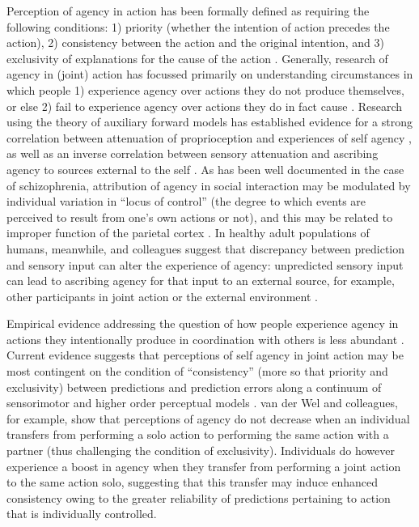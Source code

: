 \begin{CJK}{UTF8}{gbsn}
Perception of agency in action has been formally defined as requiring the following conditions: 1) priority (whether the intention of action precedes the action), 2) consistency between the action and the original intention, and 3) exclusivity of explanations for the cause of the action \citep{Wegner1999}.  Generally, research of agency in (joint) action has focussed primarily on understanding circumstances in which people 1) experience agency over actions they do not produce themselves, or else 2) fail to experience agency over actions they do in fact cause \citep[see][]{VanderWel2012}.  Research using the theory of auxiliary forward models has established evidence for a strong correlation between attenuation of proprioception and experiences of self agency \citep{Wolpert2003,Sato2008}, as well as an inverse correlation between sensory attenuation and ascribing agency to sources external to the self \citep{Brown2013}.  As has been well documented in the case of schizophrenia, attribution of agency in social interaction may be modulated by individual variation in ``locus of control'' (the degree to which events are perceived to result from one’s own actions or not), and this may be related to improper function of the parietal cortex \citep{Frith2000}. In healthy adult populations of humans, meanwhile, \textcite{Sato2008} and colleagues suggest that discrepancy between prediction and sensory input can alter the experience of agency:  unpredicted sensory input can lead to ascribing agency for that input to an external source, for example, other participants in joint action or the external environment \citep{Sato2005,Frith2007}.

Empirical evidence addressing the question of how people experience agency in actions they intentionally produce in coordination with others is less abundant \citep[but hsee][]{VanderWel2012,VanderWel2013}. Current evidence suggests that perceptions of self agency in joint action may be most contingent on the condition of ``consistency'' (more so that priority and exclusivity) between predictions and prediction errors along a continuum of sensorimotor and higher order perceptual models \citep[see][]{VanderWel2012}.  van der Wel and colleagues, for example, show that perceptions of agency do not decrease when an individual transfers from performing a solo action to performing the same action with a partner (thus challenging the condition of exclusivity).  Individuals do however experience a boost in agency when they transfer from performing a joint action to the same action solo, suggesting that this transfer may induce enhanced consistency owing to the greater reliability of predictions pertaining to action that is individually controlled.


\end{CJK}
